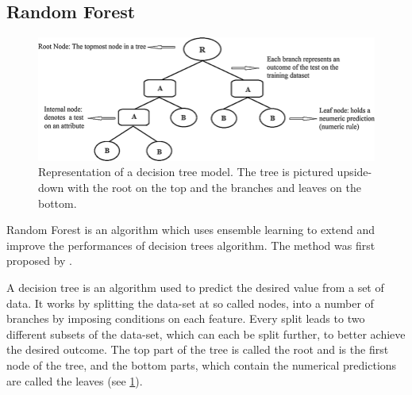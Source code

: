 \subsection{Random Forest}\label{random-forest}
\begin{figure}[!tp]
	\centering		  
	\includegraphics[width=1.\textwidth]{figures/decision_tree.png}
	\caption{Representation of a decision tree model. The tree is pictured upside-down with the root on the top and the branches and leaves on the bottom.}
	\label{fig:tree}
\end{figure}
Random Forest is an algorithm which uses ensemble learning to extend and improve the performances of decision trees algorithm. The method was first proposed by \citet{RandomHo1995}. 

A decision tree is an algorithm used to predict the desired value from a set of data. It works by splitting the data-set at so called nodes, into a number of branches by imposing conditions on each feature. Every split leads to two different subsets of the data-set, which can each be split further, to better achieve the desired outcome. The top part of the tree is called the root and is the first node of the tree, and the bottom parts, which contain the numerical predictions are called the leaves (see \ref{fig:tree}).

